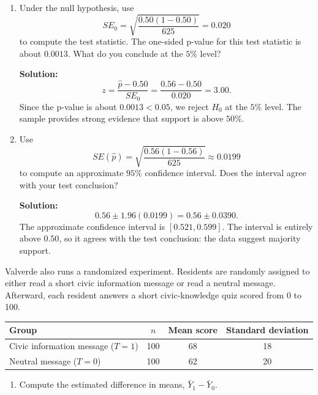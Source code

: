 \documentclass[11pt]{exam}
\begin{document}
\begin{questions}
\begin{enumerate}[leftmargin = 0.5cm, label = (\alph*), rightmargin = 0.2cm]
    \item Under the null hypothesis, use
    \[
    SE_0=\sqrt{\frac{0.50(1-0.50)}{625}}=0.020
    \]
    to compute the test statistic. The one-sided p-value for this test statistic is about $0.0013$. What do you conclude at the $5\%$ level?

    \begin{solutionorbox}[6.4cm]
    \textbf{Solution:}
    \[
    z=\frac{\widehat p-0.50}{SE_0}
    =\frac{0.56-0.50}{0.020}
    =3.00.
    \]
    Since the p-value is about $0.0013<0.05$, we reject $H_0$ at the $5\%$ level. The sample provides strong evidence that support is above $50\%$.
    \end{solutionorbox}

    \item Use
    \[
    SE(\widehat p)=\sqrt{\frac{0.56(1-0.56)}{625}}\approx 0.0199
    \]
    to compute an approximate $95\%$ confidence interval. Does the interval agree with your test conclusion?

    \begin{solutionorbox}[6.3cm]
    \textbf{Solution:}
    \[
    0.56 \pm 1.96(0.0199)
    =0.56\pm 0.0390.
    \]
    The approximate confidence interval is $[0.521,0.599]$. The interval is entirely above $0.50$, so it agrees with the test conclusion: the data suggest majority support.
    \end{solutionorbox}
\end{enumerate}

\newpage
\question[2.5]
Valverde also runs a randomized experiment. Residents are randomly assigned to either read a short civic information message or read a neutral message. Afterward, each resident answers a short civic-knowledge quiz scored from 0 to 100.

\begin{center}
\begin{tabular}{lccc}
\toprule
Group & $n$ & Mean score & Standard deviation \\
\midrule
Civic information message ($T=1$) & 100 & 68 & 18 \\
Neutral message ($T=0$)           & 100 & 62 & 20 \\
\bottomrule
\end{tabular}
\end{center}

\begin{enumerate}[leftmargin = 0.5cm, label = (\alph*), rightmargin = 0.2cm]
    \item Compute the estimated difference in means, $\bar Y_1-\bar Y_0$.


\end{enumerate}
\end{questions}
\end{document}
